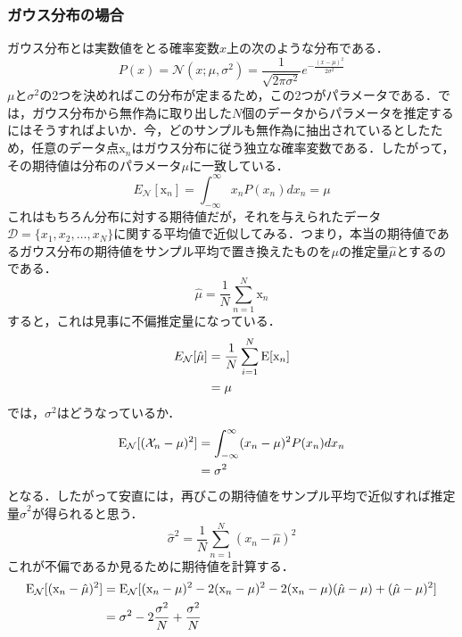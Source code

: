 \documentclass[a4paper,11pt]{jsreport}
\begin{document}
\subsubsection{ガウス分布の場合}
ガウス分布とは実数値をとる確率変数$x$上の次のような分布である．
\begin{equation}
  P(x)
  = \mathcal{N}(x; \mu, \sigma^2)
  = \frac{1}{\sqrt{2 \pi \sigma^2}} e^{-\frac{(x-\mu)^2}{2\sigma^2}}
\end{equation}
$\mu$と$\sigma^2$の2つを決めればこの分布が定まるため，この2つがパラメータである．では，ガウス分布から無作為に取り出した$N$個のデータからパラメータを推定するにはそうすればよいか．今，どのサンプルも無作為に抽出されているとしたため，任意のデータ点$\mathrm{x}_n$はガウス分布に従う独立な確率変数である．したがって，その期待値は分布のパラメータ$\mu$に一致している．
\begin{equation}
  E_{\mathcal{N}}[\mathrm{x}_n]
  = \int_{-\infty}^{\infty} x_n P(x_n) dx_n
  = \mu
\end{equation}
これはもちろん分布に対する期待値だが，それを与えられたデータ$\mathcal{D} = \{ x_1, x_2, \dots, x_N \}$に関する平均値で近似してみる．つまり，本当の期待値であるガウス分布の期待値をサンプル平均で置き換えたものを$\mu$の推定量$\hat{\mu}$とするのである．
\begin{equation}
  \hat{\mu}
  = \frac{1}{N} \sum_{n=1}^{N} \mathrm{x}_n
\end{equation}
すると，これは見事に不偏推定量になっている．
\begin{align}
  E_{\mathcal{N}}[\hat{\mu}]
   & = \frac{1}{N} \sum_{i=1}^N \mathrm{E}[\mathrm{x}_n] \notag \\
   & = \mu
\end{align}
では，$\sigma^2$はどうなっているか．
\begin{align}
  \mathrm{E}_{\mathcal{N}}[(\mathcal{X}_n - \mu)^2]
   & = \int_{-\infty}^{\infty} (x_n - \mu)^2 P(x_n) dx_n \notag \\
   & = \sigma^2
\end{align}
となる．したがって安直には，再びこの期待値をサンプル平均で近似すれば推定量$\hat{\sigma}^2$が得られると思う．
\begin{equation}
  \hat{\sigma}^2
  = \frac{1}{N} \sum_{n=1}^N (x_n - \hat{\mu})^2
\end{equation}
これが不偏であるか見るために期待値を計算する．
\begin{align}
  \mathrm{E}_{\mathcal{N}}[(\mathrm{x}_n - \hat{\mu})^2]
   & = \mathrm{E}_{\mathcal{N}}[(\mathrm{x}_n - \mu)^2 -2(\mathrm{x}_n - \mu)^2 - 2(\mathrm{x}_n - \mu)(\hat{\mu} - \mu) + (\hat{\mu} - \mu)^2] \notag \\
   & = \sigma^2 -2 \frac{\sigma^2}{N} + \frac{\sigma^2}{N}
\end{align}
\end{document}
